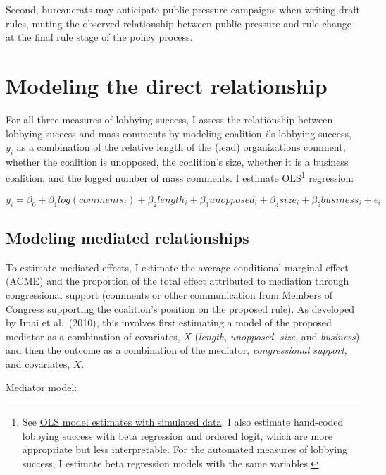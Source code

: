 \documentclass[
]{book}
\begin{document}
Second, bureaucrats may anticipate public pressure campaigns when writing draft rules, muting the observed relationship between public pressure and rule change at the final rule stage of the policy process.

\hypertarget{modeling-the-direct-relationship}{%
\section{Modeling the direct relationship}\label{modeling-the-direct-relationship}}

For all three measures of lobbying success, I assess the relationship between lobbying success and mass comments by modeling coalition \(i\)'s lobbying success, \(y_i\) as a combination of the relative length of the (lead) organizations comment, whether the coalition is unopposed, the coalition's size, whether it is a business coalition, and the logged number of mass comments. I estimate OLS\footnote{See \href{https://judgelord.github.io/dissertation/preanalysis.pdf}{OLS model estimates with simulated data}. I also estimate hand-coded lobbying success with beta regression and ordered logit, which are more appropriate but less interpretable. For the automated measures of lobbying success, I estimate beta regression models with the same variables.} regression:

\[
y_i = \beta_0 + \beta_1 log(comments_i) + \beta_2 length_i + \beta_3 unopposed_i + \beta_4 size_i + \beta_5 business_i + \epsilon_i
\]

\hypertarget{modeling-mediated-relationships}{%
\subsection{Modeling mediated relationships}\label{modeling-mediated-relationships}}

To estimate mediated effects, I estimate the average conditional marginal effect (ACME) and the proportion of the total effect attributed to mediation through congressional support (comments or other communication from Members of Congress supporting the coalition's position on the proposed rule). As developed by Imai et al.~(2010), this involves first estimating a model of the proposed mediator as a combination of covariates, \(X\) (\emph{length}, \emph{unopposed}, \emph{size}, and \emph{business}) and then the outcome as a combination of the mediator, \emph{congressional support}, and covariates, \(X\).

Mediator model:
\end{document}
